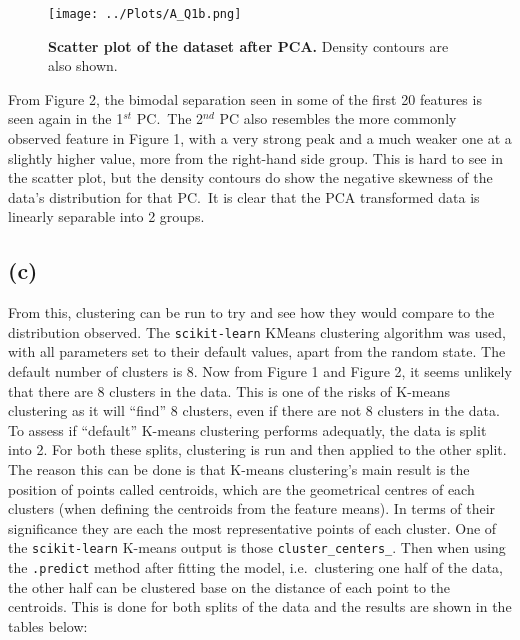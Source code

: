 \documentclass[12pt]{report} %
\begin{document}
\begin{figure}[h]
    \centering
    \texttt{[image: ../Plots/A\_Q1b.png]}
    \caption{\textbf{Scatter plot of the dataset after PCA.} Density contours are also shown.}
\end{figure}

From Figure 2, the bimodal separation seen in some of the first 20 features is seen again in the 1$^{st}$ PC.\ The 2$^{nd}$ PC also resembles the more commonly observed feature in Figure 1, with a very strong peak and a much weaker one at a slightly higher value, more from the right-hand side group. This is hard to see in the scatter plot, but the density contours do show the negative skewness of the data's distribution for that PC.\ It is clear that the PCA transformed data is linearly separable into 2 groups.

\subsection*{(c)}

From this, clustering can be run to try and see how they would compare to the distribution observed. The \texttt{scikit-learn} KMeans clustering algorithm was used, with all parameters set to their default values, apart from the random state.
The default number of clusters is 8\cite{kmeans_sklearn}. Now from Figure 1 and Figure 2, it seems unlikely that there are 8 clusters in the data. This is one of the risks of K-means clustering as it will ``find'' 8 clusters, even if there are not 8 clusters in the data. To assess if ``default'' K-means clustering performs adequatly, the data is split into 2. For both these splits, clustering is run and then applied to the other split.  
The reason this can be done is that K-means clustering's main result is the position of points called centroids, which are the geometrical centres of each clusters (when defining the centroids from the feature means). In terms of their significance they are each the most representative points of each cluster\cite[p. 243]{sklearn_book}. One of the \texttt{scikit-learn} K-means output is those \texttt{cluster\_centers\_}. Then when using the \texttt{.predict{}} method after fitting the model, i.e.\ clustering one half of the data, the other half can be clustered base on the distance of each point to the centroids. This is done for both splits of the data and the results are shown in the tables below:
\end{document}
